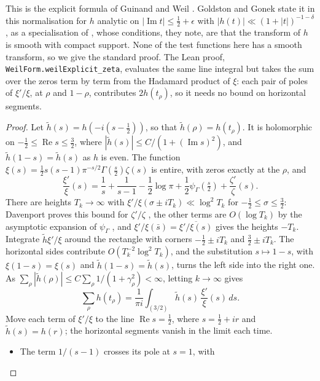 \documentclass[11pt]{article}
\theoremstyle{definition}
\newcommand{\lean}[1]{\texttt{#1}}
\begin{document}
This is the explicit formula of Guinand \cite{guinand48} and Weil \cite{weil52}. Goldston and Gonek state it in this
normalisation for $h$ analytic on $|\operatorname{Im} t| \le \frac12 + \epsilon$ with $|h(t)| \ll (1 + |t|)^{-1 -
\delta}$ \cite[Lemma~1]{goldston-gonek07}, as a specialisation of \cite[Theorem~5.12]{iwaniec-kowalski}, whose
conditions, they note, are that the transform of $h$ is smooth with compact support. None of the test functions here
has a smooth transform, so we give the standard proof. The Lean proof, \lean{WeilForm.weilExplicit\_zeta}, evaluates the
same line integral but takes the sum over the
zeros term by term from the Hadamard product of $\xi$: each pair of poles of $\xi'/\xi$, at $\rho$ and $1 - \rho$,
contributes $2h(t_\rho)$, so it needs no bound on horizontal segments.

\begin{proof}
Let $\tilde h(s) = h(-i(s - \frac12))$, so that $\tilde h(\rho) = h(t_\rho)$. It is holomorphic on $-\frac12 \le
\operatorname{Re} s
\le \frac32$, where $|\tilde h(s)| \le C/(1 + (\operatorname{Im} s)^2)$, and $\tilde h(1 - s) = \tilde h(s)$ as $h$ is
even. The function
$\xi(s) = \frac12 s(s - 1)\pi^{-s/2}\Gamma(\frac s2)\zeta(s)$ is entire, with zeros exactly at the $\rho$, and
\[
\frac{\xi'}{\xi}(s) = \frac1s + \frac{1}{s - 1} - \frac12\log\pi + \frac12\psi_\Gamma(\tfrac s2) +
\frac{\zeta'}{\zeta}(s).
\]
There are heights $T_k \to \infty$ with $\xi'/\xi(\sigma \pm iT_k) \ll \log^2 T_k$ for $-\frac12 \le \sigma \le
\frac32$: Davenport proves this bound for $\zeta'/\zeta$ \cite[Chapter~17]{davenport}, the other terms are $O(\log
T_k)$ by the asymptotic expansion of $\psi_\Gamma$ \cite[(5.11.2)]{dlmf}, and $\xi'/\xi(\bar s) =
\overline{\xi'/\xi(s)}$ gives the heights $-T_k$. Integrate $\tilde h\xi'/\xi$ around the rectangle with corners
$-\frac12 \pm iT_k$
and $\frac32 \pm iT_k$. The horizontal sides contribute $O(T_k^{-2}\log^2 T_k)$, and the substitution $s \mapsto 1 - s$,
with $\xi(1 - s) = \xi(s)$ and $\tilde h(1 - s) = \tilde h(s)$, turns the left side into the right one. As $\sum_\rho
|\tilde h(\rho)| \le C
\sum_\rho 1/(1 + \gamma_\rho^2) < \infty$, letting $k \to \infty$ gives
\[
\sum_\rho h(t_\rho) = \frac{1}{\pi i} \int_{(3/2)} \tilde h(s)\, \frac{\xi'}{\xi}(s)\,ds.
\]
Move each term of $\xi'/\xi$ to the line $\operatorname{Re} s
= \frac12$, where $s = \frac12 + ir$ and $\tilde h(s) = h(r)$;
the horizontal segments vanish in the limit each time.
\begin{itemize}
\item The term $1/(s - 1)$ crosses its pole at $s = 1$, with

\end{itemize}
\end{proof}
\end{document}

